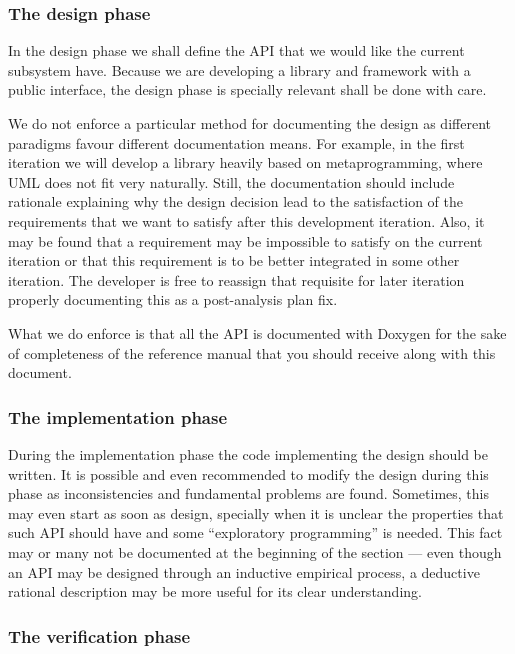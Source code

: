\subsubsection{The design phase}

In the design phase we shall define the API that we would like the
current subsystem have. Because we are developing a library and
framework with a public interface, the design phase is specially
relevant shall be done with care.

We do not enforce a particular method for documenting the design as
different paradigms favour different documentation means. For example,
in the first iteration we will develop a library heavily based on
metaprogramming, where UML does not fit very naturally. Still, the
documentation should include rationale explaining why the design
decision lead to the satisfaction of the requirements that we want to
satisfy after this development iteration. Also, it may be found that a
requirement may be impossible to satisfy on the current iteration or
that this requirement is to be better integrated in some other
iteration. The developer is free to reassign that requisite for later
iteration properly documenting this as a post-analysis plan fix.

What we do enforce is that all the API is documented with Doxygen for
the sake of completeness of the reference manual that you should
receive along with this document.

\subsubsection{The implementation phase}

During the implementation phase the code implementing the design
should be written. It is possible and even recommended to modify the
design during this phase as inconsistencies and fundamental problems
are found. Sometimes, this may even start as soon as design, specially
when it is unclear the properties that such API should have and some
``exploratory programming'' is needed. This fact may or many not be
documented at the beginning of the section --- even though an API may
be designed through an inductive empirical process, a deductive
rational description may be more useful for its clear understanding.

\subsubsection{The verification phase}


